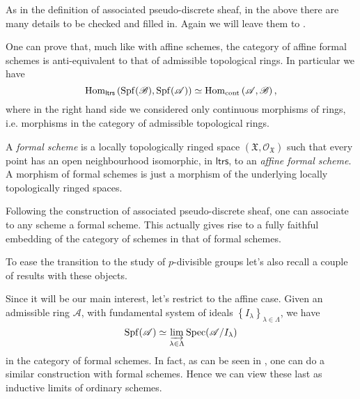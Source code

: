 \begin{rem}[]
	As in the definition of associated pseudo-discrete sheaf, in the above
	there are many details to be checked and filled in.
	Again we will leave them to \cite[Chapter I, \S10]{EGA}.
\end{rem}


\begin{rem}[]\label{EquivalenceFormalAffineSchemes}
	One can prove that, much like with affine schemes, the category of affine
	formal schemes is anti-equivalent to that of admissible topological rings.
	In particular we have
	\begin{equation*}
	\operatorname{Hom}_{\mathsf{ltrs}} \left( \operatorname{Spf}(\mathscr{B}), \operatorname{Spf}(\mathscr{A}) \right) \simeq
	\operatorname{Hom}_{ \mathrm{cont} } \left( \mathscr{A}, \mathscr{B} \right)
	,\end{equation*}
	where in the right hand side
	we considered only continuous morphisms of rings, i.e. morphisms
	in the category of admissible topological rings.
\end{rem}


\begin{defn}
	A \emph{formal scheme} is a locally topologically ringed space 
	$( \mathfrak{X} , \mathcal{O}_{ \mathfrak{X} } )$
	such that every point has an open neighbourhood isomorphic,
	in $\mathsf{ltrs}$, to an \emph{affine formal scheme}.
	A morphism of formal schemes is just a morphism of the underlying
	locally topologically ringed spaces.
\end{defn}


\begin{rem}[]
	Following the construction of associated pseudo-discrete sheaf,
	one can associate to any scheme a formal scheme.
	This actually gives rise to a fully faithful embedding of the category of schemes
	in that of formal schemes.
\end{rem}


\noindent
To ease the transition to the study of $p$-divisible groups
let's also recall a couple of results with these objects.
\begin{rem}[]
	Since it will be our main interest, let's restrict to the affine case.
	Given an admissible ring $\mathscr{A}$, with fundamental system of 
	ideals $\left\{ I_\lambda \right\}_{\lambda \in \Lambda}$, we have
	\begin{equation*}
	\operatorname{Spf}(\mathscr{A}) \simeq \varinjlim_{\lambda \in \Lambda} \operatorname{Spec}(\mathscr{A}/I_\lambda)
	\end{equation*}
	in the category of formal schemes.
	In fact, as can be seen in \cite[Chapter I, \S10.6]{EGA}, one can do a similar construction
	with formal schemes.
	Hence we can view these last as inductive limits of ordinary schemes.
\end{rem}



